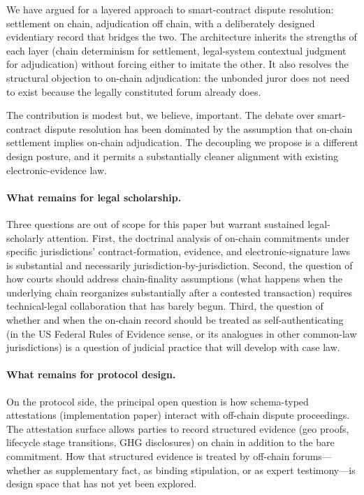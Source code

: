\documentclass[11pt,a4paper]{article}
\theoremstyle{remark}
\begin{document}
We have argued for a layered approach to smart-contract dispute
resolution: settlement on chain, adjudication off chain, with a
deliberately designed evidentiary record that bridges the two.
The architecture inherits the strengths of each layer (chain
determinism for settlement, legal-system contextual judgment for
adjudication) without forcing either to imitate the other. It
also resolves the structural objection to on-chain adjudication:
the unbonded juror does not need to exist because the legally
constituted forum already does.

The contribution is modest but, we believe, important. The
debate over smart-contract dispute resolution has been dominated
by the assumption that on-chain settlement implies on-chain
adjudication. The decoupling we propose is a different design
posture, and it permits a substantially cleaner alignment with
existing electronic-evidence law.

\paragraph{What remains for legal scholarship.}
Three questions are out of scope for this paper but warrant
sustained legal-scholarly attention. First, the doctrinal
analysis of on-chain commitments under specific jurisdictions'
contract-formation, evidence, and electronic-signature laws is
substantial and necessarily jurisdiction-by-jurisdiction. Second,
the question of how courts should address chain-finality
assumptions (what happens when the underlying chain reorganizes
substantially after a contested transaction) requires technical-legal
collaboration that has barely begun. Third, the question of
whether and when the on-chain record should be treated as
self-authenticating (in the US Federal Rules of Evidence sense,
or its analogues in other common-law jurisdictions) is a question
of judicial practice that will develop with case law.

\paragraph{What remains for protocol design.}
On the protocol side, the principal open question is how schema-typed
attestations (implementation paper) interact with off-chain
dispute proceedings. The attestation surface allows parties to
record structured evidence (geo proofs, lifecycle stage
transitions, GHG disclosures) on chain in addition to the bare
commitment. How that structured evidence is treated by off-chain
forums---whether as supplementary fact, as binding stipulation,
or as expert testimony---is design space that has not yet been
explored.
\end{document}
